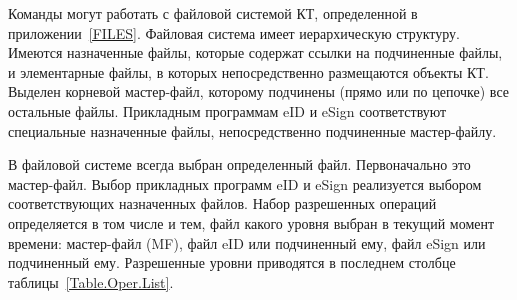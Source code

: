 Команды могут работать с файловой системой КТ, определенной в 
приложении~\ref{FILES}. Файловая система имеет иерархическую структуру.
Имеются назначенные файлы, которые содержат ссылки на подчиненные файлы,
и элементарные файлы, в которых непосредственно размещаются объекты КТ.
Выделен корневой мастер-файл, которому подчинены (прямо или по цепочке)
все остальные файлы. Прикладным программам eID и eSign соответствуют 
специальные назначенные файлы, непосредственно подчиненные мастер-файлу.

В файловой системе всегда выбран определенный файл. Первоначально это 
мастер-файл. Выбор прикладных программ eID и eSign реализуется 
выбором соответствующих назначенных файлов. 
Набор разрешенных операций определяется в том числе и тем, файл какого уровня
выбран в текущий момент времени: мастер-файл (MF), файл eID или подчиненный 
ему, файл eSign или подчиненный ему. Разрешенные уровни приводятся в последнем 
столбце таблицы~\ref{Table.Oper.List}.

